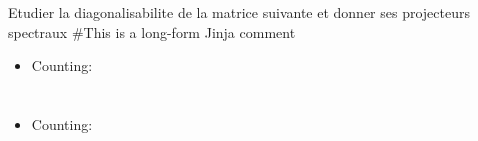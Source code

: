 \documentclass{article}%
\begin{document}
\normalsize%
Etudier la diagonalisabilite de la matrice suivante et donner ses projecteurs spectraux \newline%
\#{This is a long-form Jinja comment}
\begin{itemize}
  \item Counting: 
\end{itemize}

\section{}
\begin{itemize}
  \item Counting: 
\end{itemize}
\end{document}
